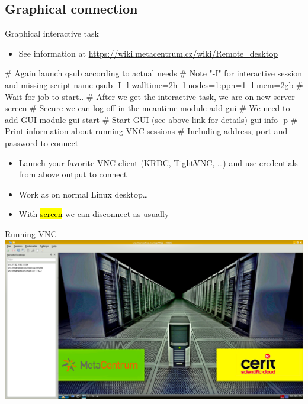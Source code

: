 \documentclass[compress, ucs, xelatex, 11pt, xcolor=svgnames,
  hyperref={
    bookmarks=true,
    unicode=true,
    colorlinks=true,
    pdftitle={Linux, command line and MetaCentrum},
    plainpages=false,
    pdfauthor={Vojtech Zeisek},
    pdfsubject={Course about use of Linux command line, writing shell scripts and using MetaCentrum of CESNET},
    pdfcreator={XeLaTeX},
    pdfkeywords={Linux, GNU, BASH, shell, command line, MetaCentrum},
    linkcolor=Red,
    anchorcolor=Blue,
    citecolor=Purple,
    filecolor=DodgerBlue,
    menucolor=DarkOrchid,
    urlcolor=DeepSkyBlue,
    pdftex},
  url={hyphens, lowtilde} %
  ]{beamer}
\renewcommand{\texttt}[1]{\hl{\ttfamily #1}}
\begin{document}
\subsection{Graphical connection}

\begin{frame}[fragile]{Graphical interactive task}
\begin{itemize}
  \item See information at \url{https://wiki.metacentrum.cz/wiki/Remote_desktop}
\end{itemize}
  \begin{bashcode}
    # Again launch qsub according to actual needs
    # Note "-I" for interactive session and missing script name
    qsub -I -l walltime=2h -l nodes=1:ppn=1 -l mem=2gb
    # Wait for job to start..
    # After we get the interactive task, we are on new server
    screen # Secure we can log off in the meantime
    module add gui # We need to add GUI module
    gui start # Start GUI (see above link for details)
    gui info -p # Print information about running VNC sessions
                # Including address, port and password to connect
  \end{bashcode}
\begin{itemize}
  \item Launch your favorite VNC client (\href{https://www.kde.org/applications/internet/krdc/}{KRDC}, \href{http://www.tightvnc.com/}{TightVNC}, \ldots) and use credentials from above output to connect
  \item Work as on normal Linux desktop\ldots
  \item With \texttt{screen} we can disconnect as usually
\end{itemize}
\end{frame}

\begin{frame}{Running VNC}
\includegraphics[width=\textwidth]{vnc.png}
\end{frame}
\end{document}
